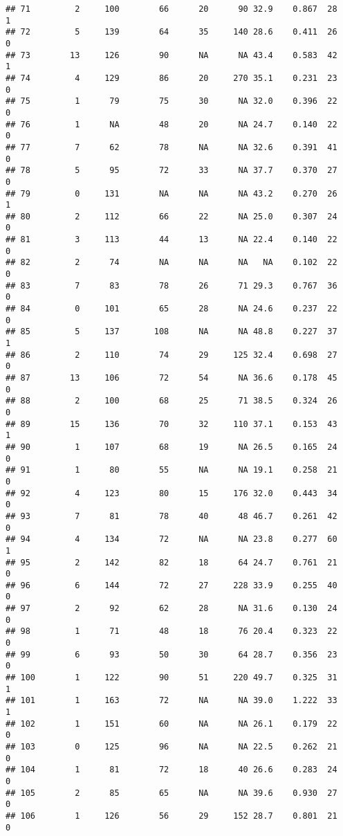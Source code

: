\documentclass[
]{article}
\begin{document}
\begin{verbatim}
## 71         2     100        66      20      90 32.9    0.867  28    1
## 72         5     139        64      35     140 28.6    0.411  26    0
## 73        13     126        90      NA      NA 43.4    0.583  42    1
## 74         4     129        86      20     270 35.1    0.231  23    0
## 75         1      79        75      30      NA 32.0    0.396  22    0
## 76         1      NA        48      20      NA 24.7    0.140  22    0
## 77         7      62        78      NA      NA 32.6    0.391  41    0
## 78         5      95        72      33      NA 37.7    0.370  27    0
## 79         0     131        NA      NA      NA 43.2    0.270  26    1
## 80         2     112        66      22      NA 25.0    0.307  24    0
## 81         3     113        44      13      NA 22.4    0.140  22    0
## 82         2      74        NA      NA      NA   NA    0.102  22    0
## 83         7      83        78      26      71 29.3    0.767  36    0
## 84         0     101        65      28      NA 24.6    0.237  22    0
## 85         5     137       108      NA      NA 48.8    0.227  37    1
## 86         2     110        74      29     125 32.4    0.698  27    0
## 87        13     106        72      54      NA 36.6    0.178  45    0
## 88         2     100        68      25      71 38.5    0.324  26    0
## 89        15     136        70      32     110 37.1    0.153  43    1
## 90         1     107        68      19      NA 26.5    0.165  24    0
## 91         1      80        55      NA      NA 19.1    0.258  21    0
## 92         4     123        80      15     176 32.0    0.443  34    0
## 93         7      81        78      40      48 46.7    0.261  42    0
## 94         4     134        72      NA      NA 23.8    0.277  60    1
## 95         2     142        82      18      64 24.7    0.761  21    0
## 96         6     144        72      27     228 33.9    0.255  40    0
## 97         2      92        62      28      NA 31.6    0.130  24    0
## 98         1      71        48      18      76 20.4    0.323  22    0
## 99         6      93        50      30      64 28.7    0.356  23    0
## 100        1     122        90      51     220 49.7    0.325  31    1
## 101        1     163        72      NA      NA 39.0    1.222  33    1
## 102        1     151        60      NA      NA 26.1    0.179  22    0
## 103        0     125        96      NA      NA 22.5    0.262  21    0
## 104        1      81        72      18      40 26.6    0.283  24    0
## 105        2      85        65      NA      NA 39.6    0.930  27    0
## 106        1     126        56      29     152 28.7    0.801  21    0

\end{verbatim}
\end{document}
